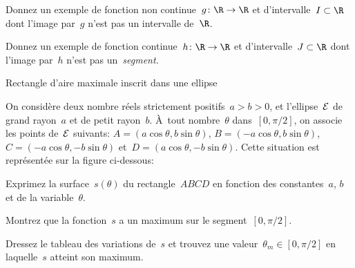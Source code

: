 \question
Donnez un exemple de fonction non continue~$g\colon\R\to\R$ et
d'intervalle~$I\subset\R$ dont l'image par~$g$ n'est pas un
intervalle de~$\R$.

\question
Donnez un exemple de fonction continue~$h\colon\R\to\R$ et
d'intervalle~$J\subset\R$ dont l'image par~$h$ n'est pas
un~\em{segment}.


\exercise Rectangle d'aire maximale inscrit dans une ellipse

On considère deux nombre réels strictement positifs~$a > b > 0$, et
l'ellipse~$\cal E$ de grand rayon~$a$ et de petit rayon~$b$. À~tout
nombre~$\theta$ dans~$[0,\pi/2]$, on associe les points de~$\cal E$
suivants:
$A = (a\cos\theta, b\sin\theta)$,
$B = (-a\cos\theta, b\sin\theta)$,
$C = (-a\cos\theta, -b\sin\theta)$
et~$D = (a\cos\theta, -b\sin\theta)$.
Cette situation est représentée sur la figure ci-dessous:

\question
Exprimez la surface~$s(\theta)$ du rectangle~$ABCD$ en fonction des
constantes~$a$, $b$ et de la variable~$\theta$.

\question
Montrez que la fonction~$s$ a un maximum sur le segment~$[0,\pi/2]$.

\question
Dressez le tableau des variations de~$s$ et trouvez une
valeur~$\theta_m\in[0,\pi/2]$ en laquelle~$s$ atteint son maximum.

\bye


